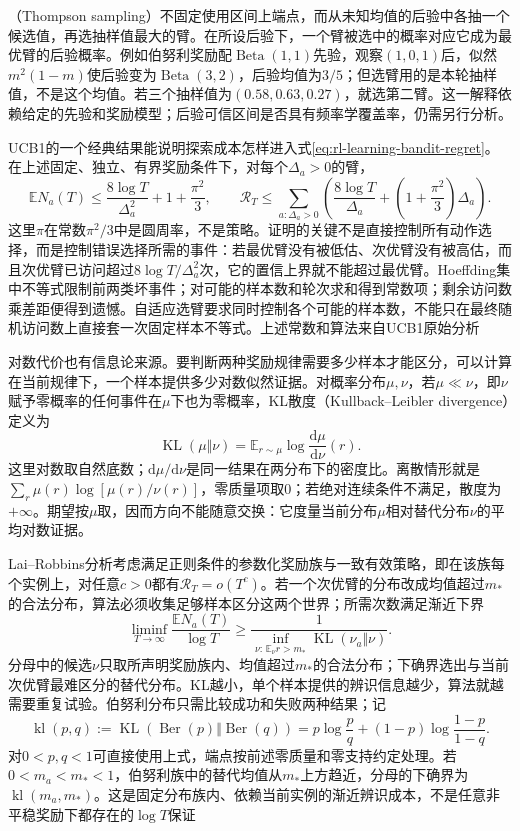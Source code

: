 （Thompson sampling）不固定使用区间上端点，而从未知均值的后验中各抽一个候选值，再选抽样值最大的臂。在所设后验下，一个臂被选中的概率对应它成为最优臂的后验概率。例如伯努利奖励配$\operatorname{Beta}(1,1)$先验，观察$(1,0,1)$后，似然$m^2(1-m)$使后验变为$\operatorname{Beta}(3,2)$，后验均值为$3/5$；但选臂用的是本轮抽样值，不是这个均值。若三个抽样值为$(0.58,0.63,0.27)$，就选第二臂。这一解释依赖给定的先验和奖励模型；后验可信区间是否具有频率学覆盖率，仍需另行分析。

UCB1的一个经典结果能说明探索成本怎样进入式\eqref{eq:rl-learning-bandit-regret}。在上述固定、独立、有界奖励条件下，对每个$\Delta_a>0$的臂，
\begin{equation}
  \mathbb E N_a(T)
  \leq \frac{8\log T}{\Delta_a^2}+1+\frac{\pi^2}{3},
  \qquad
  \mathcal R_T
  \leq\sum_{a:\Delta_a>0}
    \left(\frac{8\log T}{\Delta_a}
    +\left(1+\frac{\pi^2}{3}\right)\Delta_a\right).
  \label{eq:rl-learning-ucb-bound}
\end{equation}
这里$\pi$在常数$\pi^2/3$中是圆周率，不是策略。证明的关键不是直接控制所有动作选择，而是控制错误选择所需的事件：若最优臂没有被低估、次优臂没有被高估，而且次优臂已访问超过$8\log T/\Delta_a^2$次，它的置信上界就不能超过最优臂。Hoeffding集中不等式限制前两类坏事件；对可能的样本数和轮次求和得到常数项；剩余访问数乘差距便得到遗憾。自适应选臂要求同时控制各个可能的样本数，不能只在最终随机访问数上直接套一次固定样本不等式。上述常数和算法来自UCB1原始分析

对数代价也有信息论来源。要判断两种奖励规律需要多少样本才能区分，可以计算在当前规律下，一个样本提供多少对数似然证据。对概率分布$\mu,\nu$，若$\mu\ll\nu$，即$\nu$赋予零概率的任何事件在$\mu$下也为零概率，KL散度（Kullback--Leibler divergence）定义为
\[
  \operatorname{KL}(\mu\Vert\nu)
    =\mathbb E_{r\sim\mu}\log\frac{\mathrm d\mu}{\mathrm d\nu}(r).
\]
这里对数取自然底数；$\mathrm d\mu/\mathrm d\nu$是同一结果在两分布下的密度比。离散情形就是$\sum_r\mu(r)\log[\mu(r)/\nu(r)]$，零质量项取0；若绝对连续条件不满足，散度为$+\infty$。期望按$\mu$取，因而方向不能随意交换：它度量当前分布$\mu$相对替代分布$\nu$的平均对数证据。

Lai--Robbins分析考虑满足正则条件的参数化奖励族与一致有效策略，即在该族每个实例上，对任意$c>0$都有$\mathcal R_T=o(T^c)$。若一个次优臂的分布改成均值超过$m_*$的合法分布，算法必须收集足够样本区分这两个世界；所需次数满足渐近下界
\[
  \liminf_{T\to\infty}\frac{\mathbb E N_a(T)}{\log T}
  \geq
  \frac{1}{\inf_{\nu:\,\mathbb E_\nu r>m_*}
                \operatorname{KL}(\nu_a\Vert\nu)}.
\]
分母中的候选$\nu$只取所声明奖励族内、均值超过$m_*$的合法分布；下确界选出与当前次优臂最难区分的替代分布。KL越小，单个样本提供的辨识信息越少，算法就越需要重复试验。伯努利分布只需比较成功和失败两种结果；记
\[
  \operatorname{kl}(p,q)
    :=\operatorname{KL}(\operatorname{Ber}(p)\Vert\operatorname{Ber}(q))
    =p\log\frac pq+(1-p)\log\frac{1-p}{1-q}.
\]
对$0<p,q<1$可直接使用上式，端点按前述零质量和零支持约定处理。若$0<m_a<m_*<1$，伯努利族中的替代均值从$m_*$上方趋近，分母的下确界为$\operatorname{kl}(m_a,m_*)$。这是固定分布族内、依赖当前实例的渐近辨识成本，不是任意非平稳奖励下都存在的$\log T$保证

